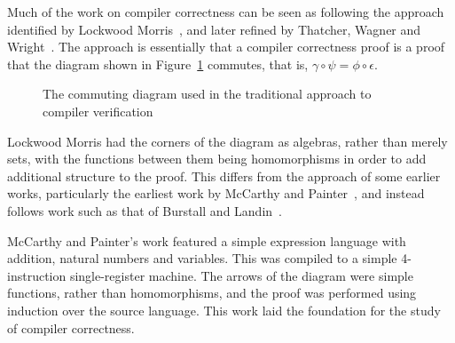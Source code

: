 \documentclass[a4paper,10pt]{report}
\begin{document}
Much of the work on compiler correctness can be seen as following the
approach identified by Lockwood Morris~\cite{morris1973}, and later
refined by Thatcher, Wagner and Wright~\cite{thatcher1979}.
The approach is essentially that a compiler correctness proof is a
proof that the diagram shown in Figure~\ref{commuting-diagram}
commutes, that is, $\gamma \circ \psi = \phi \circ \epsilon$.

\begin{figure}[ht]
  \begin{center}
  \end{center}
  \caption{The commuting diagram used in the traditional approach to
    compiler verification}
  \label{commuting-diagram}
\end{figure}

Lockwood Morris had the corners of the diagram as algebras, rather
than merely sets, with the functions between them being homomorphisms
in order to add additional structure to the proof.
This differs from the approach of some earlier works, particularly the
earliest work by McCarthy and Painter~\cite{mccarthy1967}, and instead
follows work such as that of Burstall and Landin~\cite{burstall1969}.

McCarthy and Painter's work featured a simple expression language with
addition, natural numbers and variables.
This was compiled to a simple 4-instruction single-register machine.
The arrows of the diagram were simple functions, rather than
homomorphisms, and the proof was performed using induction over the
source language.
This work laid the foundation for the study of compiler correctness.
\end{document}
